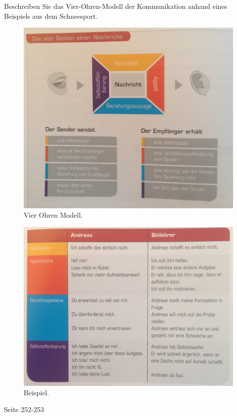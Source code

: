 \begin{question}{6}
Beschreiben Sie das Vier-Ohren-Modell der Kommunikation anhand eines Beispiels aus dem Schneesport.
\end{question}
\begin{solution}
\begin{figure}[H]
  \centering
  \includegraphics[width=12cm]{pic/vierohren.jpg}
  \caption{Vier Ohren Modell.}
  \label{fig:vierohren}
\end{figure}
\begin{figure}[H]
  \centering
  \includegraphics[width=12cm]{pic/vierohrenbsp.jpg}
  \caption{Beispiel.}
  \label{fig:viewrohrenbsp}
\end{figure}
 Seite 252-253
\end{solution}

